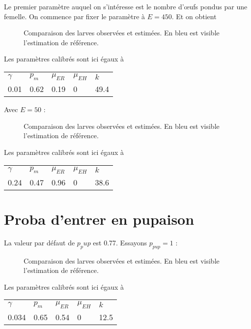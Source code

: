 \documentclass[a4paper, 11pt]{article}
\begin{document}
Le premier paramètre auquel on s'intéresse est le nombre d'œufs pondus par une femelle.
On commence par fixer le paramètre à $E = 450$. Et on obtient

\begin{figure}[h]
 \centering
 \caption{Comparaison des larves observées et estimées. En bleu est visible l'estimation de référence.}
\end{figure}

Les paramètres calibrés sont ici égaux à 

\begin{center}
\begin{tabular}{lllll}
$\gamma$ & $p_m$ & $\mu_{ER}$ & $\mu_{EH}$ & $k$\\
0.01 & 0.62 & 0.19 & 0 & 49.4
\end{tabular}
\end{center}

Avec $E = 50$ : 

\begin{figure}[h]
 \centering
 \caption{Comparaison des larves observées et estimées. En bleu est visible l'estimation de référence.}
\end{figure}

Les paramètres calibrés sont ici égaux à 

\begin{center}
\begin{tabular}{lllll}
$\gamma$ & $p_m$ & $\mu_{ER}$ & $\mu_{EH}$ & $k$\\
0.24 & 0.47 & 0.96 & 0 & 38.6
\end{tabular}
\end{center}

\newpage
\section{Proba d'entrer en pupaison}

La valeur par défaut de $p_pup$ est 0.77. Essayons $p_{pup} = 1$ :

\begin{figure}[h]
 \centering
 \caption{Comparaison des larves observées et estimées. En bleu est visible l'estimation de référence.}
\end{figure}

Les paramètres calibrés sont ici égaux à 

\begin{center}
\begin{tabular}{lllll}
$\gamma$ & $p_m$ & $\mu_{ER}$ & $\mu_{EH}$ & $k$\\
0.034 & 0.65 & 0.54 & 0 & 12.5
\end{tabular}
\end{center}
\end{document}
